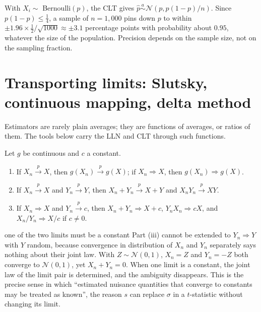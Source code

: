 \documentclass[11pt,a4paper]{article}
\newcommand{\N}{\mathcal{N}}
\newcommand{\cp}{\xrightarrow{\;p\;}}
\newcommand{\cd}{\Rightarrow}
\begin{document}
\begin{example}[Polling]
With $X_i\sim$ Bernoulli$(p)$, the CLT gives $\hat p\overset{a}\sim\N(p,p(1-p)/n)$. Since $p(1-p)\le\frac14$, a sample of $n=1{,}000$ pins down $p$ to within $\pm1.96\times\frac12/\sqrt{1000}\approx\pm3.1$ percentage points with probability about $0.95$, whatever the size of the population. Precision depends on the sample size, not on the sampling fraction.
\end{example}

\section{Transporting limits: Slutsky, continuous mapping, delta method}\label{sec:delta}

Estimators are rarely plain averages; they are functions of averages, or ratios of them. The tools below carry the LLN and CLT through such functions.

\begin{theorem}\label{thm:slutsky}
Let $g$ be continuous and $c$ a constant.
\begin{enumerate}[label=\textup{(\roman*)}]
\item If $X_n\cp X$, then $g(X_n)\cp g(X)$; if $X_n\cd X$, then $g(X_n)\cd g(X)$.
\item If $X_n\cp X$ and $Y_n\cp Y$, then $X_n+Y_n\cp X+Y$ and $X_nY_n\cp XY$.
\item If $X_n\cd X$ and $Y_n\cp c$, then $X_n+Y_n\cd X+c$, $Y_nX_n\cd cX$, and $X_n/Y_n\cd X/c$ if $c\ne0$.
\end{enumerate}
\end{theorem}

\begin{whybox}{one of the two limits must be a constant}
Part (iii) cannot be extended to $Y_n\cd Y$ with $Y$ random, because convergence in distribution of $X_n$ and $Y_n$ separately says nothing about their joint law. With $Z\sim\N(0,1)$, $X_n=Z$ and $Y_n=-Z$ both converge to $\N(0,1)$, yet $X_n+Y_n=0$. When one limit is a constant, the joint law of the limit pair is determined, and the ambiguity disappears. This is the precise sense in which ``estimated nuisance quantities that converge to constants may be treated as known'', the reason $s$ can replace $\sigma$ in a $t$-statistic without changing its limit.
\end{whybox}
\end{document}
